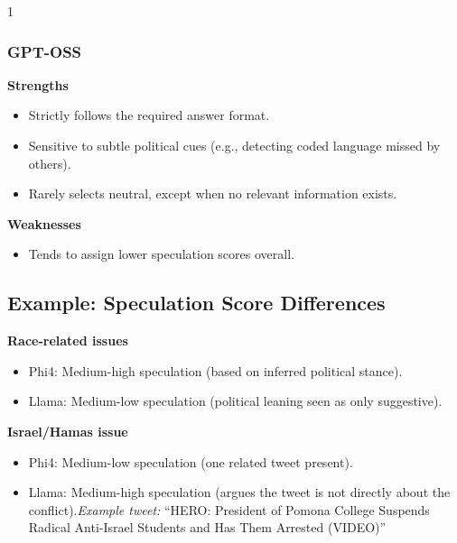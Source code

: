 \begin{spacing}{1}
\subsubsection{GPT-OSS}
\textbf{Strengths}
\begin{itemize}
    \item Strictly follows the required answer format.
    \item Sensitive to subtle political cues (e.g., detecting coded language missed by others).
    \item Rarely selects neutral, except when no relevant information exists.
\end{itemize}

\textbf{Weaknesses}
\begin{itemize}
    \item Tends to assign lower speculation scores overall.
\end{itemize}

\subsection{Example: Speculation Score Differences}

\textbf{Race-related issues}
\begin{itemize}
    \item Phi4: Medium-high speculation (based on inferred political stance).
    \item Llama: Medium-low speculation (political leaning seen as only suggestive).
\end{itemize}

\textbf{Israel/Hamas issue}
\begin{itemize}
    \item Phi4: Medium-low speculation (one related tweet present).
    \item Llama: Medium-high speculation (argues the tweet is not directly about the conflict).\textit{Example tweet:} ``HERO: President of Pomona College Suspends Radical Anti-Israel Students and Has Them Arrested (VIDEO)''
\end{itemize}


\end{spacing}
